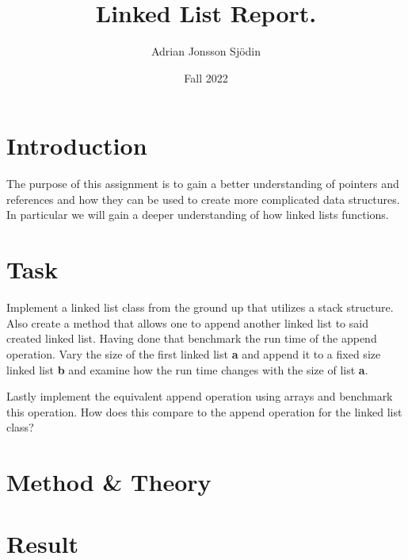 \documentclass[a4paper,11pt]{article}
\begin{document}
\title{
    \textbf{Linked List Report.}
}
\author{Adrian Jonsson Sjödin}
\date{Fall 2022}

\maketitle

\section*{Introduction}
The purpose of this assignment is to gain a better understanding of pointers and references
and how they can be used to create more complicated data structures. In particular we will
gain a deeper understanding of how linked lists functions.

\section*{Task}
Implement a linked list class from the ground up that utilizes a stack structure. Also
create a method that allows one to append another linked list to said created linked list.
Having done that benchmark the run time of the append operation. Vary the size of the
first linked list \textbf{a} and append it to a fixed size linked list \textbf{b} and
examine how the run time changes with the size of list \textbf{a}.

Lastly implement the equivalent append operation using arrays and benchmark this operation.
How does this compare to the append operation for the linked list class?

\section*{Method \& Theory}

\section*{Result}
\end{document}

